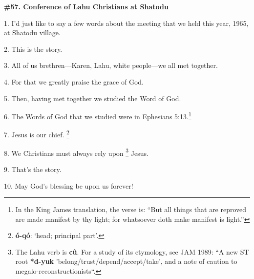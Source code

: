 
\textbf{\#57. Conference of Lahu Christians at Shatodu}

1. I'd just like to say a few words  about the meeting that we held this year,
1965, at Shatodu village.

2. This is the story.

3. All of us brethren---Karen, Lahu, white people---we all met together.

4. For that we greatly praise the grace of God.

5. Then, having met together we studied the Word of God.

6. The Words of God that we studied were in Ephesians 5:13.\footnote{In the King James translation, the verse is: ``But all things that are reproved are made manifest by thy light; for whatsoever doth make manifest is light.''}

7. Jesus is our chief. \footnote{\textbf{ó-qó}: `head; principal part'.}

8. We Christians must always rely upon \footnote{The Lahu verb is \textbf{cû}. For a study of its etymology, see JAM 1989: ``A new ST root  \textbf{*d-yuk }'belong/trust/depend/accept/take', and a note of caution to megalo-reconstructionists``.} Jesus.

9. That's the story.

10. May God's blessing be upon us forever!

